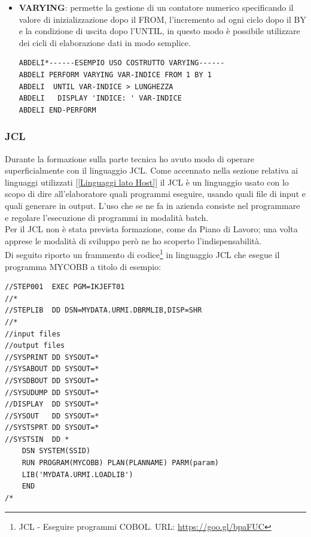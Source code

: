 \begin{itemize}
	\item \textbf{VARYING}: permette la gestione di un contatore numerico specificando il valore di inizializzazione dopo il FROM, l'incremento ad ogni ciclo dopo il BY e la condizione di uscita dopo l'UNTIL, in questo modo è possibile utilizzare dei cicli di elaborazione dati in modo semplice.
	\begin{lstlisting}[language=cobol]	
ABDELI*------ESEMPIO USO COSTRUTTO VARYING------
ABDELI PERFORM VARYING VAR-INDICE FROM 1 BY 1
ABDELI  UNTIL VAR-INDICE > LUNGHEZZA
ABDELI   DISPLAY 'INDICE: ' VAR-INDICE
ABDELI END-PERFORM
	\end{lstlisting}
		
\end{itemize}
	
\subsubsection{JCL}
Durante la formazione sulla parte tecnica ho avuto modo di operare superficialmente con il linguaggio JCL\glossario. Come accennato nella sezione relativa ai linguaggi utilizzati [\ref{Linguaggi lato Host}] il JCL è un linguaggio usato con lo scopo di dire all'elaboratore quali programmi eseguire, usando quali file di input e quali generare in output. L'uso che se ne fa in azienda consiste nel programmare e regolare l’esecuzione di programmi in modalità batch\glossario. \\

Per il JCL non è stata prevista formazione, come da Piano di Lavoro; una volta apprese le modalità di sviluppo però ne ho scoperto l'indispensabilità.\\

Di seguito riporto un frammento di codice\footnote{JCL - Eseguire programmi COBOL. URL: \url{https://goo.gl/bpaFUC}} in linguaggio JCL che esegue il programma MYCOBB a titolo di esempio:

\begin{lstlisting}[language=Cobol]
//STEP001  EXEC PGM=IKJEFT01
//*
//STEPLIB  DD DSN=MYDATA.URMI.DBRMLIB,DISP=SHR
//*
//input files
//output files
//SYSPRINT DD SYSOUT=*
//SYSABOUT DD SYSOUT=*
//SYSDBOUT DD SYSOUT=*
//SYSUDUMP DD SYSOUT=*
//DISPLAY  DD SYSOUT=*
//SYSOUT   DD SYSOUT=*
//SYSTSPRT DD SYSOUT=*
//SYSTSIN  DD *
    DSN SYSTEM(SSID)
    RUN PROGRAM(MYCOBB) PLAN(PLANNAME) PARM(param)
    LIB('MYDATA.URMI.LOADLIB')
    END
/*
\end{lstlisting}

